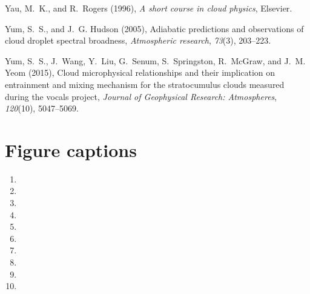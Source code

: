 \documentclass[draft,linenumbers]{AGUJournal}
\begin{document}
\begin{thebibliography}{60}
Yau, M.~K., and R.~Rogers (1996), \textit{A short course in cloud physics},
  Elsevier.

Yum, S.~S., and J.~G. Hudson (2005), Adiabatic predictions and observations of
  cloud droplet spectral broadness, \textit{Atmospheric research},
  \textit{73}(3), 203--223.

Yum, S.~S., J.~Wang, Y.~Liu, G.~Senum, S.~Springston, R.~McGraw, and J.~M. Yeom
  (2015), Cloud microphysical relationships and their implication on
  entrainment and mixing mechanism for the stratocumulus clouds measured during
  the vocals project, \textit{Journal of Geophysical Research: Atmospheres},
  \textit{120}(10), 5047--5069.

\end{thebibliography}

\newpage
\section*{Figure captions}
\begin{enumerate}[label=Figure \arabic*:\,, leftmargin=0cm,itemindent=.5cm,labelwidth=\itemindent,labelsep=0cm,align=left]
\item {}

\item {}

\item {}

\item {}

\item {}

\item {}

\item {}

\item {}

\item {}

\item {}


\end{enumerate}
\end{document}
